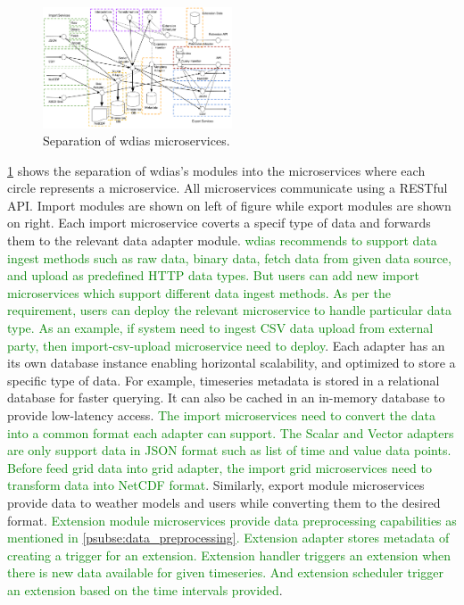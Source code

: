 \documentclass[conference]{IEEEtran}
\newcommand{\gk}[1]{\textcolor{green}{#1}}
\begin{document}
\begin{figure}[b!]
\centerline{\includegraphics[width=0.5\textwidth]{images/separation_microservices-p1.pdf}}
\caption{Separation of \acrshort{wdias} microservices.}
\label{pfi:microservice_separation}
\end{figure}

\cref{pfi:microservice_separation} shows the separation of \acrshort{wdias}'s modules into the microservices where each circle represents a microservice. All microservices communicate using a RESTful API. Import modules are shown on left of figure while export modules are shown on right. Each import microservice coverts a specif type of data and forwards them to the relevant data adapter module. \gk{\acrshort{wdias} recommends to support data ingest methods such as raw data, binary data, fetch data from given data source, and upload as predefined HTTP data types. But users can add new import microservices which support different data ingest methods. As per the requirement, users can deploy the relevant microservice to handle particular data type. As an example, if system need to ingest CSV data upload from external party, then import-csv-upload microservice need to deploy}. Each adapter has an its own database instance enabling horizontal scalability, and optimized to store a specific type of data. For example, timeseries metadata is stored in a relational database for faster querying. It can also be cached in an in-memory database to provide low-latency access. \gk{The import microservices need to convert the data into a common format each adapter can support. The Scalar and Vector adapters are only support data in JSON format such as list of time and value data points. Before feed grid data into grid adapter, the import grid microservices need to transform data into NetCDF format}. Similarly, export module microservices provide data to weather models and users while converting them to the desired format. \gk{Extension module microservices provide data preprocessing capabilities as mentioned in \cref{psubse:data_preprocessing}. Extension adapter stores metadata of creating a trigger for an extension. Extension handler triggers an extension when there is new data available for given timeseries. And extension scheduler trigger an extension based on the time intervals provided}.
\end{document}
